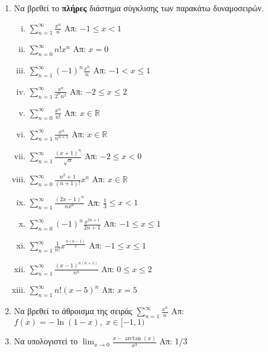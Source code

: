 




\everymath{\displaystyle}
\pagestyle{askhseis}




\begin{center}
  \minibox{\large\bfseries \textcolor{Col1}{Ασκήσεις στις Δυναμοσειρές}}
\end{center}

\vspace{\baselineskip}

\begin{enumerate}
  \item Να βρεθεί το \textbf{πλήρες} διάστημα σύγκλισης των παρακάτω δυναμοσειρών.
    \begin{enumerate}[i)]
      \item $\sum_{n=1}^{\infty} \frac{x^{n}}{n}$ \hfill Απ: $-1\leq x <1$
      \item $\sum_{n=0}^{\infty} n!x^{n}$ \hfill Απ: $x=0$
      \item $\sum_{n=1}^{\infty} (-1)^{n}\frac{x^{n}}{n}$ \hfill Απ: $-1<x\leq 1$
      \item $\sum_{n=1}^{\infty} \frac{x^{n}}{2^{n}n^{2}}$ \hfill Απ: $-2\leq x \leq 2$
      \item $\sum_{n=0}^{\infty} \frac{x^{n}}{n!}$ \hfill Απ: $x\in \mathbb{R}$
      \item $\sum_{n=1}^{\infty} \frac{x^{n}}{n^{n+1}}$ \hfill Απ: $x\in \mathbb{R}$
      \item $\sum_{n=1}^{\infty} \frac{(x+1)^{n}}{\sqrt{n}}$ \hfill Απ: $-2\leq x <0$
      \item $\sum_{n=0}^{\infty} \frac{n^{2}+1}{(n+1)!}x^{n}$ \hfill Απ: $x\in\mathbb{R}$
      \item $\sum_{n=1}^{\infty} \frac{(2x-1)^{n}}{nx^{n}}$ 
        \hfill Απ: $\frac{1}{3}\leq x<1$
      \item $\sum_{n=0}^{\infty} (-1)^{n}\frac{x^{2n+1}}{2n+1}$ 
        \hfill Απ: $-1\leq x\leq 1$
      \item $\sum_{n=1}^{\infty} \frac{1}{n!} x^{\frac{n(n-1)}{2}}$ 
        \hfill Απ: $-1\leq x\leq 1$
      \item $\sum_{n=1}^{\infty} \frac{(x-1)^{n(n+1)}}{n^{n}}$ 
        \hfill Απ: $0\leq x \leq 2$
      \item $ \sum_{n=1}^{\infty} n!(x-5)^{n} $ \hfill Απ: $ x=5 $  
    \end{enumerate}

  \item Να βρεθεί το άθροισμα της σειράς $ \sum_{n=1}^{\infty} \frac{x^{n}}{n} $ 
    \hfill Απ: $ f(x) = - \ln{(1-x)}, \; x \in [-1,1) $ 

  \item Να υπολογιστεί το $ \lim_{x \to 0} \frac{x - \arctan(x)}{x^{3}} $ \hfill Απ: 1/3 
\end{enumerate}


